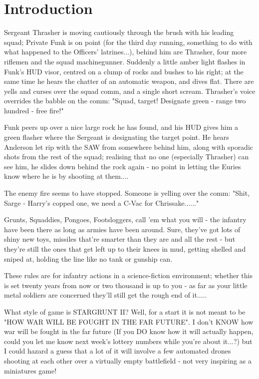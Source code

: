 \chapter{Introduction}
\begin{itshape}
Sergeant Thrasher is moving cautiously through the brush with his leading squad; Private Funk is on point (for the third day running, something to do with what happened to the Officers' latrines...), behind him are Thrasher, four more riflemen and the squad machinegunner. Suddenly a little amber light flashes in Funk's HUD visor, centred on a clump of rocks and bushes to his right; at the same time he hears the chatter of an automatic weapon, and dives flat. There are yells and curses over the squad comm, and a single short scream. Thrasher's voice overrides the babble on the comm: "Squad, target! Designate green - range two hundred - free fire!"

Funk peers up over a nice large rock he has found, and his HUD gives him a green flasher where the Sergeant is designating the target point. He hears Anderson let rip with the SAW from somewhere behind him, along with sporadic shots from the rest of the squad; realising that no one (especially Thrasher) can see him, he slides down behind the rock again - no point in letting the Euries know where he is by shooting at them....

The enemy fire seems to have stopped. Someone is yelling over the comm: "Shit, Sarge - Harry's copped one, we need a C-Vac for Chrissake......" 
\end{itshape}

Grunts, Squaddies, Pongoes, Footsloggers, call 'em what you will - the infantry have been there as long as armies have been around. Sure, they've got lots of shiny new toys, missiles that're smarter than they are and all the rest - but they're still the ones that get left up to their knees in mud, getting shelled and sniped at, holding the line like no tank or gunship can.

These rules are for infantry actions in a science-fiction environment; whether this is set twenty years from now or two thousand is up to you - as far as your little metal soldiers are concerned they'll still get the rough end of it..... 

What style of game is STARGRUNT II? Well, for a start it is not meant to be "HOW WAR WILL BE FOUGHT IN THE FAR FUTURE". I don't KNOW how war will be fought in the far future (If you DO know how it will actually happen, could you let me know next week's lottery numbers while you're about it...?) but I could hazard a guess that a lot of it will involve a few automated drones shooting at each other over a virtually empty battlefield - not very inspiring as a miniatures game!

